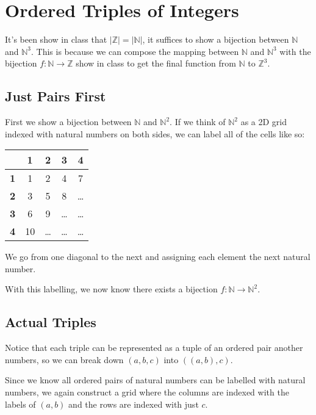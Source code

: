 \documentclass[12pt]{article}
\newcommand{\N}{\mathbb{N}}
\begin{document}
\section{Ordered Triples of Integers}

It's been show in class that $|\mathbb{Z}|=|\N|$, it suffices to show a bijection
between $\N$ and $\N^3$.
This is because we can compose the mapping between $\N$ and $\N^3$ with
the bijection $f: \N \to \mathbb{Z}$ show in class to get the final
function from $\N$ to $\mathbb{Z}^3$.

\subsection{Just Pairs First}

First we show a bijection between $\N$ and $\N^2$.
If we think of $\N^2$ as a 2D grid indexed with natural numbers on both sides,
we can label all of the cells like so:
\begin{center}
    \begin{tabular}{c|cccc}
                   & \textbf{1} & \textbf{2} & \textbf{3} & \textbf{4} \\ \hline
        \textbf{1} & 1          & 2          & 4          & 7          \\
        \textbf{2} & 3          & 5          & 8          & \ldots     \\
        \textbf{3} & 6          & 9          & \ldots     & \ldots     \\
        \textbf{4} & 10         & \ldots     & \ldots     & \ldots     \\
    \end{tabular}
\end{center}
We go from one diagonal to the next and assigning each element the next natural number.

With this labelling, we now know there exists a bijection $f: \N \to \N^2$.

\subsection{Actual Triples}

Notice that each triple can be represented as a tuple of an ordered pair another numbers,
so we can break down $(a, b, c)$ into $((a, b), c)$.

Since we know all ordered pairs of natural numbers can be labelled with natural numbers,
we again construct a grid where the columns are indexed with the labels of $(a, b)$
and the rows are indexed with just $c$.
\end{document}
